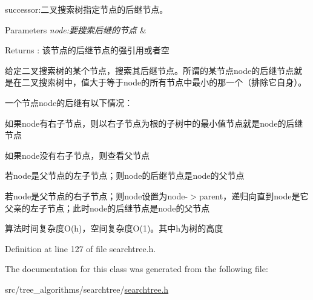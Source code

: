 successor\+:二叉搜索树指定节点的后继节点。 


\begin{DoxyParams}{Parameters}
{\em node\+:要搜索后继的节点} & \\
\hline
\end{DoxyParams}
\begin{DoxyReturn}{Returns}
\+: 该节点的后继节点的强引用或者空
\end{DoxyReturn}
给定二叉搜索树的某个节点，搜索其后继节点。所谓的某节点{\ttfamily node}的后继节点就是在二叉搜索树中，值大于等于{\ttfamily node}的所有节点中最小的那一个（排除它自身）。

一个节点{\ttfamily node}的后继有以下情况：


\begin{DoxyItemize}
\item 如果{\ttfamily node}有右子节点，则以右子节点为根的子树中的最小值节点就是{\ttfamily node}的后继节点
\item 如果{\ttfamily node}没有右子节点，则查看父节点
\begin{DoxyItemize}
\item 若{\ttfamily node}是父节点的左子节点；则{\ttfamily node}的后继节点是{\ttfamily node}的父节点
\item 若{\ttfamily node}是父节点的右子节点；则{\ttfamily node}设置为{\ttfamily node-\/$>$parent}，递归向直到{\ttfamily node}是它父亲的左子节点；此时{\ttfamily node}的后继节点是{\ttfamily node}的父节点
\end{DoxyItemize}
\end{DoxyItemize}

算法时间复杂度\+O(h)，空间复杂度\+O(1)。其中h为树的高度 

Definition at line 127 of file searchtree.\+h.



The documentation for this class was generated from the following file\+:\begin{DoxyCompactItemize}
\item 
src/tree\+\_\+algorithms/searchtree/\hyperlink{searchtree_8h}{searchtree.\+h}\end{DoxyCompactItemize}

